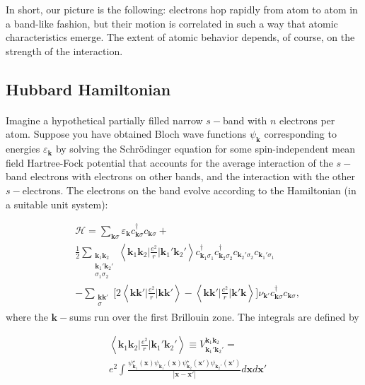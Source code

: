 In short, our picture is the following: electrons hop rapidly from atom to atom in a band-like fashion, but their motion is correlated in such a way that atomic characteristics emerge. The extent of atomic behavior depends, of course, on the strength of the interaction.

\subsection{Hubbard Hamiltonian}\label{hubbardHamiltonian}\paragraph{}

Imagine a hypothetical partially filled narrow $s-$band with $n$ electrons per atom. Suppose you have obtained Bloch wave functions $\psi_{\bm k}$ corresponding to energies $\varepsilon_{\bm k}$ by solving the Schr\"odinger equation for some spin-independent mean field Hartree-Fock potential that accounts for the average interaction of the $s-$band electrons with electrons on other bands, and the interaction with the other $s-$electrons. The electrons on the band evolve according to the Hamiltonian (in a suitable unit system):

\begin{equation}\label{eq:startingHamiltonian}
\begin{split}
&\mathcal{H} = \sum_{\bm k \sigma} \varepsilon_{\bm k} c_{\bm k \sigma}^\dagger c_{\bm k \sigma} + \\
&\frac{1}{2} \sum_{ \substack{\bm k_1 \bm k_2 \\ \bm k_1' \bm k_2' \\ \sigma_1 \sigma_2 } } \left\langle \bm k_1 \bm k_2 \bigg| \frac{e^2}{r} \bigg| \bm k_1' \bm k_2' \right\rangle 
 c_{\bm k_1 \sigma_1}^\dagger c_{\bm k_2 \sigma_2}^\dagger c_{\bm k_2' \sigma_2} c_{\bm k_1' \sigma_1} \\
 &- \sum_{ \substack{\bm k \bm k' \\ \sigma} } \bigg[ 2 \left\langle \bm k \bm k' \bigg| \frac{e^2}{r} \bigg| \bm k \bm k' \right\rangle - \left\langle \bm k \bm k' \bigg| \frac{e^2}{r} \bigg| \bm k' \bm k \right\rangle \bigg] \nu_{\bm k'} c_{\bm k \sigma}^\dagger c_{\bm k \sigma} ,
\end{split}
\end{equation}
where the $\bm k-$sums run over the first Brillouin zone. The integrals are defined by

\begin{equation}\label{eq:integrals}
\begin{split}
&\left\langle \bm k_1 \bm k_2 \bigg| \frac{e^2}{r} \bigg| \bm k_1' \bm k_2' \right\rangle \equiv V^{\bm k_1 \bm k_2}_{\bm k_1' \bm k_2'}  =  \\
&e^2 \int \frac{\psi_{\bm k_1}^\star (\bm x) \psi_{\bm k_1'} (\bm x) \psi_{\bm k_2}^\star (\bm x') \psi_{\bm k_2'}(\bm x') }{| \bm x - \bm x' |} d\bm x d\bm x'
\end{split}
\end{equation}

